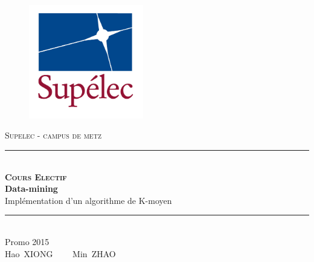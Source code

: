 \documentclass{article}
\begin{document}
\newcommand\highlight[1]{\colorbox{yellow}{#1}} 
\renewcommand\thesection{\arabic{section}}
\renewcommand\thesubsection{>>}
\begin{titlepage}
\newcommand{\HRule}{\rule{\linewidth}{1mm}} %
\newcommand{\VRule}{\rule{\lineheight}{0.2mm}} %
\center %
\begin{figure}[h ]
\centering
\includegraphics[width=50mm]{Logo_Supelec_RVB.jpg}
\end{figure}
\textsc{\LARGE Supelec - campus de metz}\\[0.5cm] %
\vspace{1.2cm}
\HRule \\[0.5cm]
{\textsc{\Huge \bfseries Cours Electif}\\[1cm]{\huge  \bfseries Data-mining}\\[0.7cm] \huge Implémentation d'un algorithme de K-moyen}\\[0.4cm] 
\HRule \\[1.5cm]
\vspace{2.5cm}
\Large {
Promo 2015\\ 
\vspace{1cm}
Hao\ \textsc{XIONG} \ \ \ \
Min\ \textsc{ZHAO}
}
\vfill %
\end{titlepage}
\tableofcontents 
\listoffigures 
\lstlistoflistings
\newpage
\end{document}
